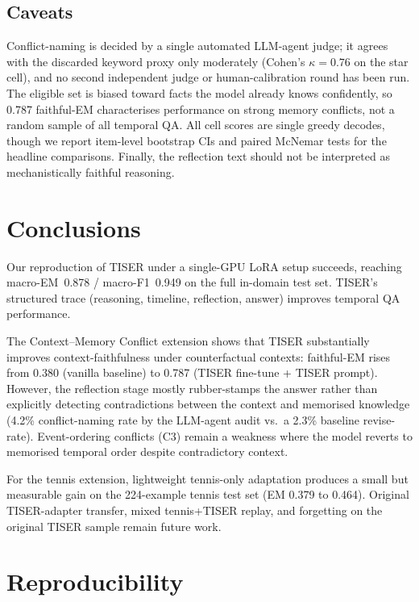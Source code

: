 \documentclass[conference]{IEEEtran}
\begin{document}
\subsection{Caveats}

Conflict-naming is decided by a single automated LLM-agent judge; it agrees with the discarded keyword proxy only moderately (Cohen's $\kappa{=}0.76$ on the star cell), and no second independent judge or human-calibration round has been run. The eligible set is biased toward facts the model already knows confidently, so 0.787 faithful-EM characterises performance on strong memory conflicts, not a random sample of all temporal QA. All cell scores are single greedy decodes, though we report item-level bootstrap CIs and paired McNemar tests for the headline comparisons. Finally, the reflection text should not be interpreted as mechanistically faithful reasoning.

\section{Conclusions}

Our reproduction of TISER under a single-GPU LoRA setup succeeds, reaching macro-EM~0.878 / macro-F1~0.949 on the full in-domain test set. TISER's structured trace (reasoning, timeline, reflection, answer) improves temporal QA performance.

The Context--Memory Conflict extension shows that TISER substantially improves context-faithfulness under counterfactual contexts: faithful-EM rises from 0.380 (vanilla baseline) to 0.787 (TISER fine-tune + TISER prompt). However, the reflection stage mostly rubber-stamps the answer rather than explicitly detecting contradictions between the context and memorised knowledge (4.2\% conflict-naming rate by the LLM-agent audit vs.\ a 2.3\% baseline revise-rate). Event-ordering conflicts (C3) remain a weakness where the model reverts to memorised temporal order despite contradictory context.

For the tennis extension, lightweight tennis-only adaptation produces a small but measurable gain on the 224-example tennis test set (EM 0.379 to 0.464). Original TISER-adapter transfer, mixed tennis+TISER replay, and forgetting on the original TISER sample remain future work.

\section{Reproducibility}
\end{document}
